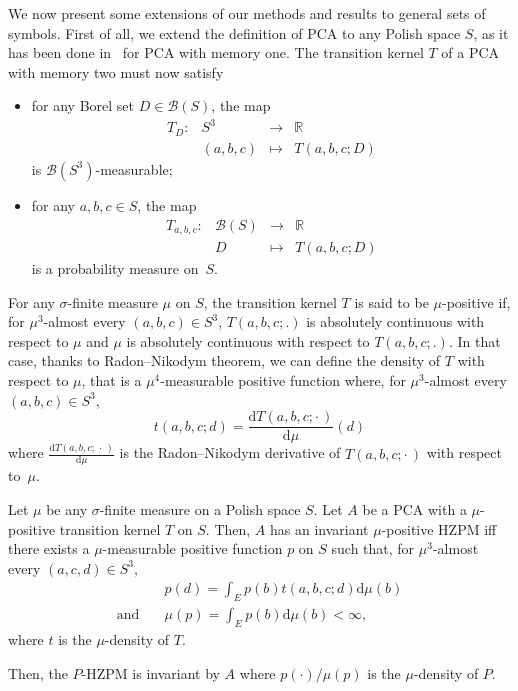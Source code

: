 \documentclass[AHL,Unicode,longabstracts]{cedram}
\newcounter{a}
\newenvironment{cond}{\refstepcounter{a}{\upshape\emph{Cond.~\thea}}\pointir}{}
\newcommand{\app}[5]{\begin{array}{rccl} #1:&#2&\longrightarrow &#3\\ &#4&\longmapsto &#5\end{array}}
\newcommand{\diff}[1]{\mathrm{d} #1}
\newcommand{\borel}[1]{\mathcal{B}\left(#1 \right)}
\newcommand{\RR}{\mathbb{R}}
\begin{document}
We now present some extensions of our methods and results to general sets of symbols. First of all, we extend the definition of PCA to any Polish space $S$, as it has been done in~\cite{Casse16} for PCA with memory one. The transition kernel $T$ of a PCA with memory two must now satisfy
\begin{itemize}
\item for any Borel set $D \in \borel{S}$, the map
\[
\app{T_D}{S^3}{\RR}{(a,b,c)}{T(a,b,c;D)}
\]
is $\mathcal{B}(S^3)$-measurable;
\item for any $a,b,c\in S$, the map
\[
\app{T_{a,b,c}}{\borel{S}}{\RR}{D}{T(a,b,c;D)}
\]
is a probability measure on~$S$.
\end{itemize}

For any $\sigma$-finite measure $\mu$ on $S$, the transition kernel $T$ is said to be $\mu$-positive if, for $\mu^3$-almost every $(a,b,c)\in S^3$, $T(a,b,c;.)$ is absolutely continuous with respect to $\mu$ and $\mu$ is absolutely continuous with respect to $T(a,b,c;.)$. In that case, thanks to Radon--Nikodym theorem, we can define the density of $T$ with respect to $\mu$, that is a $\mu^4$-measurable positive function where, for $\mu^3$-almost every $(a,b,c)\in S^3$,
\begin{equation*}
t(a,b,c;d) = \frac{\text{d} T(a,b,c;\cdot\,)}{\text{d} \mu}(d)
\end{equation*}
where $ \frac{\text{d} T(a,b,c;\,\cdot\,)}{\text{d} \mu}$ is the Radon--Nikodym derivative of $T(a,b,c;\cdot\,)$ with respect to~$\mu$.

\begin{theo}
Let $\mu$ be any $\sigma$-finite measure on a Polish space $S$. Let $A$ be a PCA with a $\mu$-positive transition kernel $T$ on $S$. Then, $A$ has an invariant $\mu$-positive HZPM iff
\begin{cond} \label{cond:HZPM-polonais}
there exists a $\mu$-measurable positive function $p$ on $S$ such that, for $\mu^3$-almost every $(a,c,d) \in S^3$,
\begin{align*}
& p(d) = \int_E p(b) t(a,b,c;d) \diff{\mu(b)}\\ \text{and}\quad
& \mu(p) = \int_E p(b) \diff{\mu(b)} < \infty,
\end{align*}
where $t$ is the $\mu$-density of $T$.
\end{cond}

Then, the $P$-HZPM is invariant by $A$ where $p(\cdot)/\mu(p)$ is the $\mu$-density of $P$.
\end{theo}
\goodbreak
\end{document}
